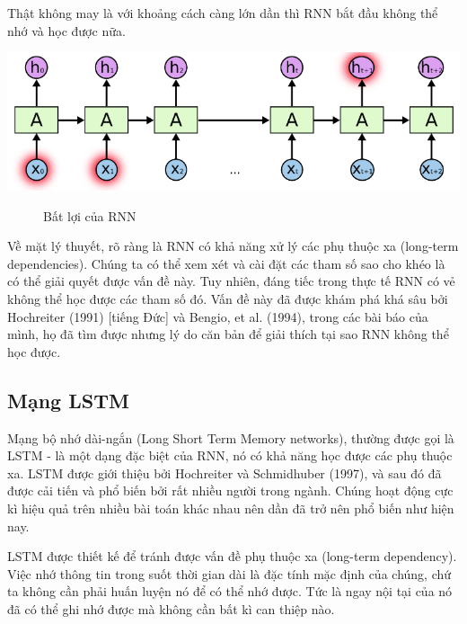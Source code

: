 Thật không may là với khoảng cách càng lớn dần thì RNN bắt đầu không thể nhớ và học được nữa.
\begin{center}
    \includegraphics[scale=.3]{image/chapter6/ptx2.png}
    \begin{figure}[htp]
    \begin{center}
     
    \end{center}
    \caption{Bất lợi của RNN}
    \end{figure}
\end{center}
Về mặt lý thuyết, rõ ràng là RNN có khả năng xử lý các phụ thuộc xa (long-term dependencies). Chúng ta có thể xem xét và cài đặt các tham số sao cho khéo là có thể giải quyết được vấn đề này. Tuy nhiên, đáng tiếc trong thực tế RNN có vẻ không thể học được các tham số đó. Vấn đề này đã được khám phá khá sâu bởi Hochreiter (1991) [tiếng Đức] và Bengio, et al. (1994), trong các bài báo của mình, họ đã tìm được nhưng lý do căn bản để giải thích tại sao RNN không thể học được.


\subsection{Mạng LSTM}
Mạng bộ nhớ dài-ngắn (Long Short Term Memory networks), thường được gọi là LSTM - là một dạng đặc biệt của RNN, nó có khả năng học được các phụ thuộc xa. LSTM được giới thiệu bởi Hochreiter và Schmidhuber (1997), và sau đó đã được cải tiến và phổ biến bởi rất nhiều người trong ngành. Chúng hoạt động cực kì hiệu quả trên nhiều bài toán khác nhau nên dần đã trở nên phổ biến như hiện nay.

LSTM được thiết kế để tránh được vấn đề phụ thuộc xa (long-term dependency). Việc nhớ thông tin trong suốt thời gian dài là đặc tính mặc định của chúng, chứ ta không cần phải huấn luyện nó để có thể nhớ được. Tức là ngay nội tại của nó đã có thể ghi nhớ được mà không cần bất kì can thiệp nào.


